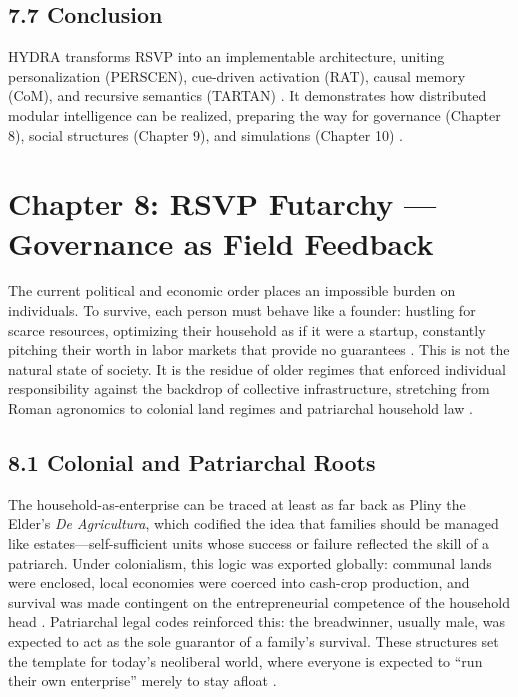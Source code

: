 \documentclass[12pt]{article}
\begin{document}
{{\subsection*{7.7 Conclusion}

HYDRA transforms RSVP into an implementable architecture, uniting personalization (PERSCEN), cue-driven activation (RAT), causal memory (CoM), and recursive semantics (TARTAN) \citep{bird1988, milewski2018}. It demonstrates how distributed modular intelligence can be realized, preparing the way for governance (Chapter 8), social structures (Chapter 9), and simulations (Chapter 10) \citep{whitehead1978}.

\section*{Chapter 8: RSVP Futarchy --- Governance as Field Feedback}

The current political and economic order places an impossible burden on individuals. To survive, each person must behave like a founder: hustling for scarce resources, optimizing their household as if it were a startup, constantly pitching their worth in labor markets that provide no guarantees \citep{zuboff2019}. This is not the natural state of society. It is the residue of older regimes that enforced individual responsibility against the backdrop of collective infrastructure, stretching from Roman agronomics to colonial land regimes and patriarchal household law \citep{lanier2018}.

\subsection*{8.1 Colonial and Patriarchal Roots}

The household-as-enterprise can be traced at least as far back as Pliny the Elder’s \textit{De Agricultura}, which codified the idea that families should be managed like estates—self-sufficient units whose success or failure reflected the skill of a patriarch. Under colonialism, this logic was exported globally: communal lands were enclosed, local economies were coerced into cash-crop production, and survival was made contingent on the entrepreneurial competence of the household head \citep{ortega1957}. Patriarchal legal codes reinforced this: the breadwinner, usually male, was expected to act as the sole guarantor of a family’s survival. These structures set the template for today’s neoliberal world, where everyone is expected to “run their own enterprise” merely to stay afloat \citep{zuboff2019}.

}}
\end{document}
